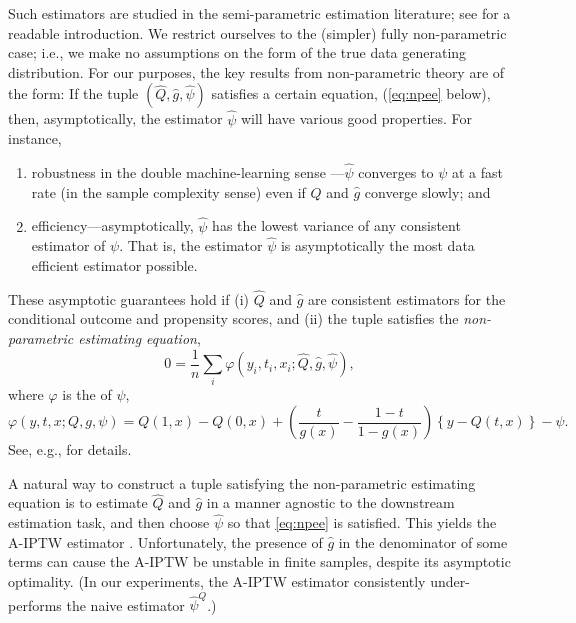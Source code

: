 \documentclass{article}
\begin{document}
Such estimators are studied in the semi-parametric estimation literature;
see \citet{Kennedy:2016} for a readable introduction.
We restrict ourselves to the (simpler) fully non-parametric case; i.e.,
we make no assumptions on the form of the true data generating distribution.
For our purposes, the key results from non-parametric theory are of the form:
If the tuple $(\hat{Q},\hat{g},\hat{\psi})$ satisfies a certain equation, (\cref{eq:npee} below),
then, asymptotically, the estimator $\hat{\psi}$ will have various good properties.
For instance, 
\begin{enumerate}[nosep]
\item robustness in the double machine-learning sense \cite{Chernozhukov:Chetverikov:Demirer:Duflo:Hansen:Newey:Robins:2017, Chernozhukov:Chetverikov:Demirer:Duflo:Hansen:Newey:2017}---$\hat{\psi}$ converges to $\psi$
at a fast rate (in the sample complexity sense) even if $\hat{Q}$ and $\hat{g}$ converge slowly; and
\item efficiency---asymptotically, $\hat{\psi}$ has the lowest variance of any consistent estimator of $\psi$.
  That is, the estimator $\hat{\psi}$ is asymptotically the most data efficient estimator possible.
\end{enumerate}

These asymptotic guarantees hold if
(i) $\hat{Q}$ and $\hat{g}$ are consistent estimators for the conditional outcome and propensity scores,
and (ii) the tuple satisfies the \emph{non-parametric estimating equation},
\begin{equation}
0=\frac{1}{n}\sum_{i}\varphi(y_i, t_i, x_i;\hat{Q},\hat{g},\hat{\psi}),\label{eq:npee}
\end{equation}
where $\varphi$ is the  of $\psi$,
\[
\varphi(y,t,x; Q,g,\psi)=Q(1,x)-Q(0,x)+ \left(\frac{t}{g(x)} -\frac{1-t}{1-g(x)} \right)\left\{y-Q(t,x)\right\} -\psi.
\]
See, e.g., \citet{Chernozhukov:Chetverikov:Demirer:Duflo:Hansen:Newey:2017,vanderLaan:Rose:2011} for details.

A natural way to construct a tuple satisfying the non-parametric estimating equation is
to estimate $\hat{Q}$ and $\hat{g}$ in a manner agnostic to the downstream
estimation task, and then choose $\hat{\psi}$ so that \cref{eq:npee} is satisfied.
This yields the A-IPTW estimator \cite{Robins:Rotnitzky:vanderLaan:2000,Robins:2000}.
Unfortunately, the presence of $\hat{g}$ in the denominator of some terms
can cause the A-IPTW be unstable in finite samples, despite its asymptotic optimality. 
(In our experiments, the A-IPTW estimator consistently under-performs the naive estimator $\hat{\psi}^Q$.)
\end{document}

